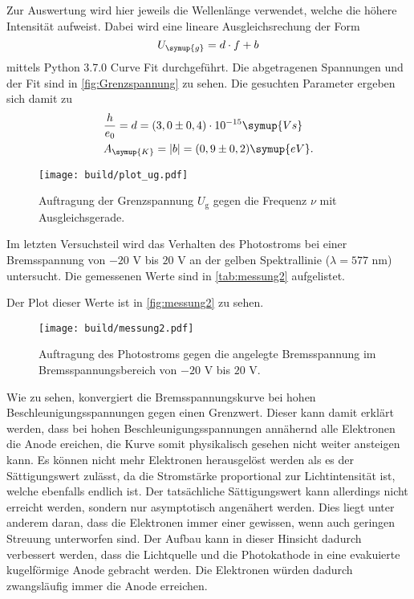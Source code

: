 Zur Auswertung wird hier jeweils die Wellenlänge verwendet, welche die höhere Intensität aufweist.
Dabei wird eine lineare Ausgleichsrechung der Form
\begin{equation}
  \label{eqn:ausgleich2}
  U_{\symup{g}} = d \cdot f + b
\end{equation}
mittels Python 3.7.0 Curve Fit durchgeführt. Die abgetragenen Spannungen und der Fit sind in \autoref{fig:Grenzspannung} zu sehen.
Die gesuchten Parameter ergeben sich damit zu 
\begin{align*}
  & \frac{h}{e_0} = d               = (3,0 \pm 0,4) \cdot 10^{-15} \symup{Vs} \\
  & A_{\symup{K}} = \lvert b \rvert = (0,9 \pm 0,2) \symup{eV}. \\
\end{align*}  

\begin{figure}
    \centering
    \texttt{[image: build/plot\_ug.pdf]}
    \caption{Auftragung der Grenzspannung $U_\text{g}$ gegen die Frequenz $\nu$ mit Ausgleichsgerade.}
    \label{fig:Grenzspannung}
\end{figure}    



Im letzten Versuchsteil wird das Verhalten des Photostroms bei einer Bremsspannung von $-20$ V bis $20$ V an der gelben Spektrallinie
($\lambda = 577$ nm) untersucht. Die gemessenen Werte sind in \autoref{tab:messung2} aufgelistet.

Der Plot dieser Werte ist in \autoref{fig:messung2} zu sehen.
\begin{figure}
    \centering
    \texttt{[image: build/messung2.pdf]}
    \caption{Auftragung des Photostroms gegen die angelegte Bremsspannung im Bremsspannungsbereich von $-20$ V bis $20$ V.}
    \label{fig:messung2}
\end{figure}
Wie zu sehen, konvergiert die Bremsspannungskurve bei hohen Beschleunigungsspannungen gegen einen Grenzwert. Dieser
kann damit erklärt werden, dass bei hohen Beschleunigungsspannungen
annähernd alle Elektronen die Anode ereichen, die Kurve somit physikalisch gesehen nicht weiter ansteigen kann. Es können nicht mehr Elektronen 
herausgelöst werden als es der Sättigungswert zulässt, da die Stromstärke proportional zur Lichtintensität ist, welche ebenfalls endlich ist. 
Der tatsächliche Sättigungswert kann allerdings nicht erreicht werden, sondern nur asymptotisch angenähert werden. Dies liegt unter anderem daran,
dass die Elektronen immer einer gewissen, wenn auch geringen Streuung unterworfen sind. Der Aufbau kann in dieser Hinsicht dadurch verbessert werden, 
dass die Lichtquelle und die Photokathode in eine evakuierte kugelförmige Anode gebracht werden. Die Elektronen würden dadurch zwangsläufig 
immer die Anode erreichen.
 
